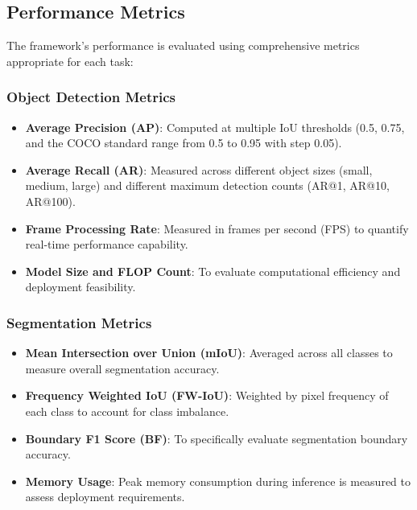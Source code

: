 \subsection{Performance Metrics}
The framework's performance is evaluated using comprehensive metrics appropriate for each task:

\subsubsection{Object Detection Metrics}
\begin{itemize}
    \item \textbf{Average Precision (AP)}: Computed at multiple IoU thresholds (0.5, 0.75, and the COCO standard range from 0.5 to 0.95 with step 0.05).
    
    \item \textbf{Average Recall (AR)}: Measured across different object sizes (small, medium, large) and different maximum detection counts (AR@1, AR@10, AR@100).
    
    \item \textbf{Frame Processing Rate}: Measured in frames per second (FPS) to quantify real-time performance capability.
    
    \item \textbf{Model Size and FLOP Count}: To evaluate computational efficiency and deployment feasibility.
\end{itemize}

\subsubsection{Segmentation Metrics}
\begin{itemize}
    \item \textbf{Mean Intersection over Union (mIoU)}: Averaged across all classes to measure overall segmentation accuracy.
    
    \item \textbf{Frequency Weighted IoU (FW-IoU)}: Weighted by pixel frequency of each class to account for class imbalance.
    
    \item \textbf{Boundary F1 Score (BF)}: To specifically evaluate segmentation boundary accuracy.
    
    \item \textbf{Memory Usage}: Peak memory consumption during inference is measured to assess deployment requirements.
\end{itemize}


